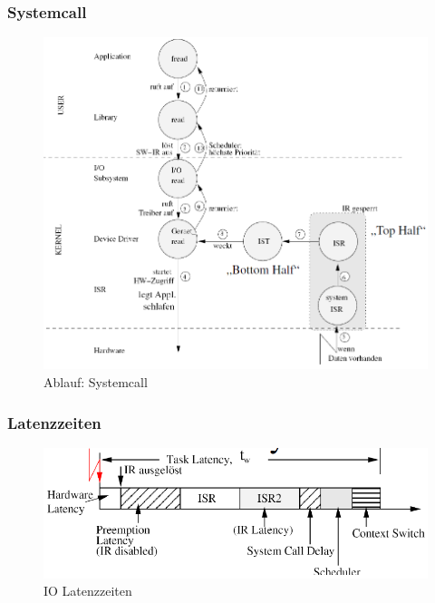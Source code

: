 \subsubsection{Systemcall}
\begin{figure}[h!]
	\begin{center}
		\includegraphics[width=.75\linewidth]{pics/syscall}
		\caption{Ablauf: Systemcall}
	\end{center}
\end{figure}

\subsubsection{Latenzzeiten}
\begin{figure}[h!]
	\begin{center}
		\includegraphics[width=.75\linewidth]{pics/latency}
		\caption{IO Latenzzeiten}
	\end{center}
\end{figure}

